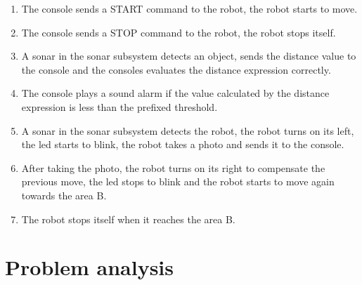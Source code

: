 \documentclass[a4paper]{article}
\begin{document}
\begin{enumerate}
			\item The console sends a START command to the robot, the robot starts to move.
			\item The console sends a STOP command to the robot, the robot stops itself.
			\item A sonar in the sonar subsystem detects an object, sends the distance value to the console and the consoles evaluates the distance expression correctly.
			\item The console plays a sound alarm if the value calculated by the distance expression is less than the prefixed threshold.
			\item A sonar in the sonar subsystem detects the robot, the robot turns on its left, the led starts to blink, the robot takes a photo and sends it to the console.
			\item After taking the photo, the robot turns on its right to compensate the previous move, the led stops to blink and the robot starts to move again towards the area B.
			\item The robot stops itself when it reaches the area B.
		\end{enumerate}



\section{Problem analysis }
\end{document}
